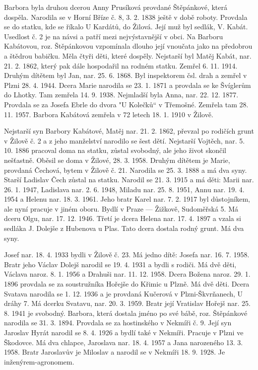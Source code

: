 \documentclass[../dejiny-rodu-prusiku.tex]{subfiles}
\begin{document}
Barbora byla druhou dcerou Anny Prusíková provdané Štěpánkové, která dospěla. Narodila se v Horní Bří­ze č. 8, 3. 2. 1838 ještě v době roboty. Provdala se do statku, kde se říkalo U Kardátů, do Žilová. Její muž byl sedlák, V. Kabát. Usedlost č. 2 je na návsi a patří mezi nejvýstavnější v obci. Na Barboru Kabátovou, roz. Štěpánkovou vzpomínala dlouho její vnou­čata jako na předobrou a štědrou babičku. Měla čtyři děti, které dospěly. Nejstarší byl Matěj Kabát, nar. 21. 2. 1862, který pak dále hospodařil na rodném statku. Zemřel 6. 11. 1914. Druhým dítětem byl Jan, nar. 25. 6. 1868. Byl inspektorem čsl. drah a zemřel v Plzni 28. 4. 1944. Dcera Marie narodila se 23. 1. 1871 a provdala se ke Švíglerům do Lhotky. Tam zemřela 14. 9. 1938. Nejmladší byla Anna, nar. 22. 12. 1877. Provdala se za Josefa Ebrle do dvora "U Kolečků“ v Třemošné. Zemřela tam 28. 11. 1957. Barbora Kabátová zemřela v 72 letech 18. 1. 1910 v Žilově.

Nejstarší syn Barbory Kabátové, Matěj nar. 21. 2. 1862, převzal po rodičích grunt v Žilově č. 2 a z jeho manželství narodilo se šest dětí. Nejstarší Vojtěch, nar. 5. 10. 1886 pracoval doma na statku, zůstal svo­bodný, ale jeho život skončil nešťastně. Oběsil se doma v Žilové, 28. 3. 1958. Druhým dítětem je Marie, provdaná Čechová, bytem v Žilově č. 21. Narodila se 25. 3. 1888 a má dva syny. Starší Ladislav Čech zůstal na statku. Narodil se 21. 3. 1915 a má děti: Marii nar. 26. 1. 1947, Ladislava nar. 2. 6. 1948, Miladu nar. 25. 8. 1951, Annu nar. 19. 4. 1954 a Helenu nar. 18. 3. 1961. Jeho bratr Karel nar. 7. 2. 1917 byl důstojníkem, ale nyní pracuje v jiném oboru. Bydlí v Praze — Žižkově, Sudoměřská 5. Má dceru Olgu, nar. 17. 12. 1946. Třetí je dcera Helena nar. 17. 4. 1897 a vzala si sedláka J. Dolejše z Hubenova u Plas. Tato dcera dostala rodný grunt. Má dva syny.

Josef nar. 18. 4. 1933 bydli v Žilově č. 23. Má jedno dítě: Josefa nar. 16. 7. 1958. Bratr jeho Václav Dolejš narodil se 19. 4. 1931 a bydli s rodiči. Má dvě dě­ti, Václava naroz. 8. 1. 1956 a Drahuši nar. 11. 12. 1958. Dcera Božena naroz. 29. 1. 1896 provdala se za soustružníka Hořejše do Křimic u Plzně. Má dvě děti. Dcera Svatava narodila se 1. 12. 1936 a je provdaná Kučerová v Plzni-Škvrňanech, U dráhy 7. Má dcerku Svatavu, nar. 20. 3. 1959. Bratr její Vratislav Hořejš nar. 25. 8. 1941 je svobodný.
Barbora, která dostala jméno po své bábě, roz. Štěpánkové narodila se 31. 3. 1894. Provdala se za hostinského v Nekmíři č. 9. Její syn Jaroslav Hyrát narodil se 8. 4. 1926 a bydlí také v Nekmíři. Pracuje v Plzni ve Škodovce. Má dva chlapce, Jaroslava nar. 18. 4. 1957 a Jana narozeného 13. 3. 1958. Bratr Jaroslavův je Miloslav a narodil se v Nekmíři 18. 9. 1928. Je inženýrem-agronomem.
\end{document}
